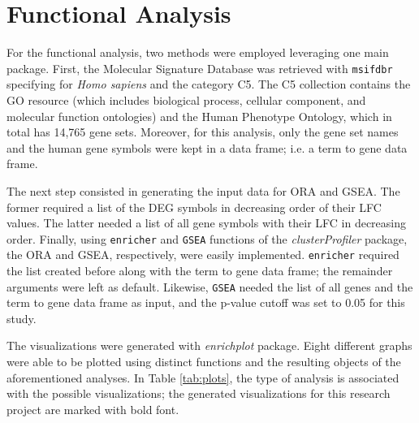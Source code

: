\section{Functional Analysis} \label{path-method}

For the functional analysis, two methods were employed leveraging one main package. First, the Molecular Signature Database was retrieved with \verb|msifdbr| specifying for \textit{Homo sapiens} and the category C5. The C5 collection contains the GO resource (which includes biological process, cellular component, and molecular function ontologies) and the Human Phenotype Ontology, which in total has 14,765 gene sets. Moreover, for this analysis, only the gene set names and the human gene symbols were kept in a data frame; i.e. a term to gene data frame.

The next step consisted in generating the input data for ORA and GSEA. The former required a list of the DEG symbols in decreasing order of their LFC values. The latter needed a list of all gene symbols with their LFC in decreasing order. Finally, using \verb|enricher| and \verb|GSEA| functions of the \textit{clusterProfiler} package, the ORA and GSEA, respectively, were easily implemented. \verb|enricher| required the list created before along with the term to gene data frame; the remainder arguments were left as default. Likewise, \verb|GSEA| needed the list of all genes and the term to gene data frame as input, and the p-value cutoff was set to 0.05 for this study.

The visualizations were generated with \textit{enrichplot} package. Eight different graphs were able to be plotted using distinct functions and the resulting objects of the aforementioned analyses. In Table \ref{tab:plots}, the type of analysis is associated with the possible visualizations; the generated visualizations for this research project are marked with bold font.

